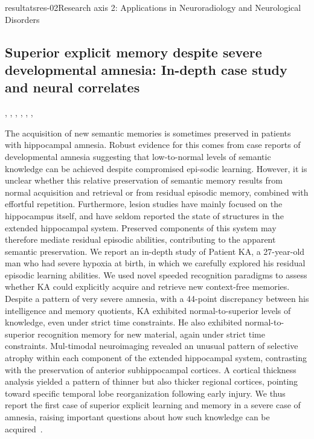 \documentclass{ra2018}
\begin{document}
\begin{module}{resultats}{res-02}{Research axis 2: Applications in Neuroradiology and Neurological Disorders}
\subsection{Superior explicit memory despite severe developmental amnesia: In-depth case study and neural correlates}
\begin{participants}
      , 
      ,
      ,
      ,
      ,
      ,
\end{participants}
The acquisition of new semantic memories is sometimes preserved in patients with hippocampal amnesia. Robust evidence for this comes from case reports of developmental amnesia suggesting that low-to-normal levels of semantic knowledge can be achieved despite compromised epi-sodic learning. However, it is unclear whether this relative preservation of semantic memory results from normal acquisition and retrieval or from residual episodic memory, combined with effortful repetition. Furthermore, lesion studies have mainly focused on the hippocampus itself, and have seldom reported the state of structures in the extended hippocampal system. Preserved components of this system may therefore mediate residual episodic abilities, contributing to the apparent semantic preservation. We report an in-depth study of Patient KA, a 27-year-old man who had severe hypoxia at birth, in which we carefully explored his residual episodic learning abilities. We used novel speeded recognition paradigms to assess whether KA could explicitly acquire and retrieve new context-free memories. Despite a pattern of very severe amnesia, with a 44-point discrepancy between his intelligence and memory quotients, KA exhibited normal-to-superior levels of knowledge, even under strict time constraints. He also exhibited normal-to-superior recognition memory for new material, again under strict time constraints. Mul-timodal neuroimaging revealed an unusual pattern of selective atrophy within each component of the extended hippocampal system, contrasting with the preservation of anterior subhippocampal cortices. A cortical thickness analysis yielded a pattern of thinner but also thicker regional cortices, pointing toward specific temporal lobe reorganization following early injury. We thus report the first case of superior explicit learning and memory in a severe case of amnesia, raising important questions about how such knowledge can be acquired~\cite{jonin:inserm-01916086}.



\end{module}
\end{document}
